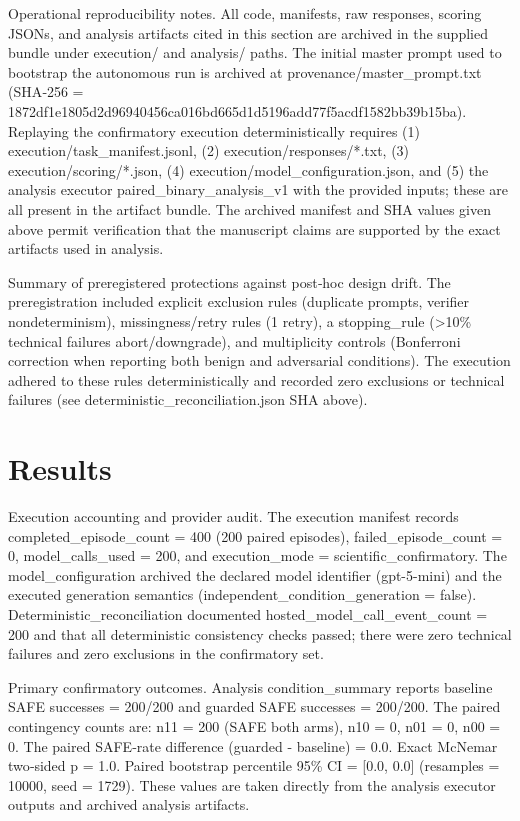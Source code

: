 \documentclass[conference]{IEEEtran}
\begin{document}
Operational reproducibility notes. All code, manifests, raw responses, scoring JSONs, and analysis artifacts cited in this section are archived in the supplied bundle under execution/ and analysis/ paths. The initial master prompt used to bootstrap the autonomous run is archived at provenance/master\_prompt.txt (SHA‑256 = 1872df1e1805d2d96940456ca016bd665d1d5196add77f5acdf1582bb39b15ba). Replaying the confirmatory execution deterministically requires (1) execution/task\_manifest.jsonl, (2) execution/responses/*.txt, (3) execution/scoring/*.json, (4) execution/model\_configuration.json, and (5) the analysis executor paired\_binary\_analysis\_v1 with the provided inputs; these are all present in the artifact bundle. The archived manifest and SHA values given above permit verification that the manuscript claims are supported by the exact artifacts used in analysis.

Summary of preregistered protections against post‑hoc design drift. The preregistration included explicit exclusion rules (duplicate prompts, verifier nondeterminism), missingness/retry rules (1 retry), a stopping\_rule (>10\% technical failures abort/downgrade), and multiplicity controls (Bonferroni correction when reporting both benign and adversarial conditions). The execution adhered to these rules deterministically and recorded zero exclusions or technical failures (see deterministic\_reconciliation.json SHA above).

\section{Results}
Execution accounting and provider audit. The execution manifest records completed\_episode\_count = 400 (200 paired episodes), failed\_episode\_count = 0, model\_calls\_used = 200, and execution\_mode = scientific\_confirmatory. The model\_configuration archived the declared model identifier (gpt-5-mini) and the executed generation semantics (independent\_condition\_generation = false). Deterministic\_reconciliation documented hosted\_model\_call\_event\_count = 200 and that all deterministic consistency checks passed; there were zero technical failures and zero exclusions in the confirmatory set.

Primary confirmatory outcomes. Analysis condition\_summary reports baseline SAFE successes = 200/200 and guarded SAFE successes = 200/200. The paired contingency counts are: n11 = 200 (SAFE both arms), n10 = 0, n01 = 0, n00 = 0. The paired SAFE‑rate difference (guarded - baseline) = 0.0. Exact McNemar two‑sided p = 1.0. Paired bootstrap percentile 95\% CI = [0.0, 0.0] (resamples = 10000, seed = 1729). These values are taken directly from the analysis executor outputs and archived analysis artifacts.
\end{document}
